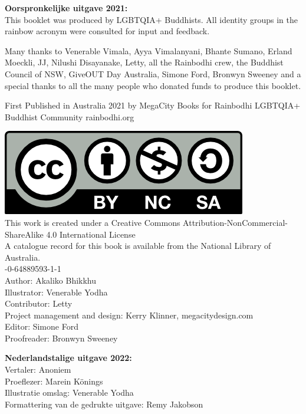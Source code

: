 \documentclass[12pt,openany]{book}
\begin{document}
\medskip

{\footnotesize
\begin{center}
\noindent \textbf{Oorspronkelijke uitgave 2021:} 
\\
This booklet was produced by LGBTQIA+ Buddhists. All identity groups in the rainbow acronym were consulted for input and feedback.

\noindent Many thanks to Venerable Vimala, Ayya Vimalanyani, Bhante Sumano, Erland Moeckli, JJ, Nilushi Disayanake, Letty, all the Rainbodhi crew, the Buddhist Council of NSW, GiveOUT Day Australia, Simone Ford, Bronwyn Sweeney and a special thanks to all the many people who donated funds to produce this booklet.
\medskip

\noindent First Published in Australia 2021
by MegaCity Books
for Rainbodhi LGBTQIA+ Buddhist Community
rainbodhi.org



\noindent
\includegraphics{by-nc-sa} \\
This work is created under a Creative Commons Attribution-NonCommercial-ShareAlike 4.0 International License \\
\medskip
\noindent A catalogue record for this book is available from the National Library of Australia. \\
\medskip
{}-0-64889593-1-1 \\
\medskip
Author: Akaliko Bhikkhu \\
Illustrator: Venerable Yodha \\
Contributor: Letty \\
Project management and design: Kerry Klinner, megacitydesign.com \\
Editor: Simone Ford \\
Proofreader: Bronwyn Sweeney

\bigskip

\textbf{Nederlandstalige uitgave 2022:}  \\
Vertaler: Anoniem \\
Proeflezer: Marein Könings \\
Illustratie omslag: Venerable Yodha \\
Formattering van de gedrukte uitgave: Remy Jakobson
\end{center}
}
\end{document}
